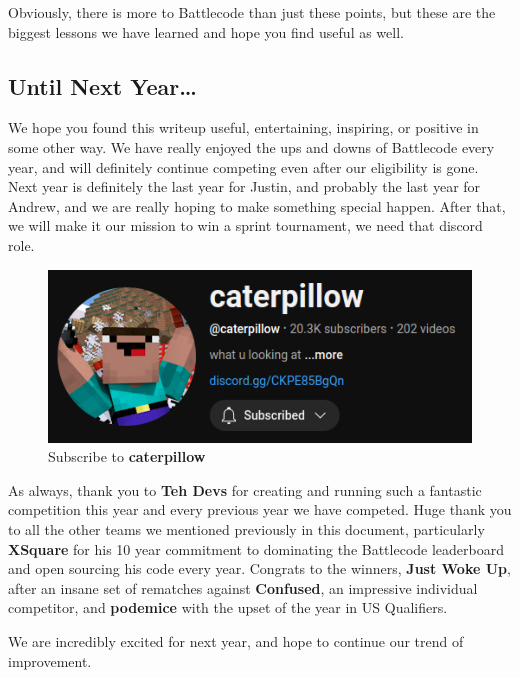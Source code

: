 Obviously, there is more to Battlecode than just these points, but these are the biggest lessons we have learned and hope you find useful as well.

\subsection{Until Next Year\dots}

We hope you found this writeup useful, entertaining, inspiring, or positive in some other way. We have really enjoyed the ups and downs of Battlecode every year, and will definitely continue competing even after our eligibility is gone. Next year is definitely the last year for Justin, and probably the last year for Andrew, and we are really hoping to make something special happen. After that, we will make it our mission to win a sprint tournament, we need that discord role.

\begin{figure}[H]
  \centering
  \includegraphics[scale=0.5]{images/caterpillow.png}
  \caption{Subscribe to \textbf{caterpillow}}
\end{figure}

As always, thank you to \textbf{Teh Devs} for creating and running such a fantastic competition this year and every previous year we have competed. Huge thank you to all the other teams we mentioned previously in this document, particularly \textbf{XSquare} for his 10 year commitment to dominating the Battlecode leaderboard and open sourcing his code every year. Congrats to the winners, \textbf{Just Woke Up}, after an insane set of rematches against \textbf{Confused}, an impressive individual competitor, and \textbf{podemice} with the upset of the year in US Qualifiers.

\medskip

We are incredibly excited for next year, and hope to continue our trend of improvement.
